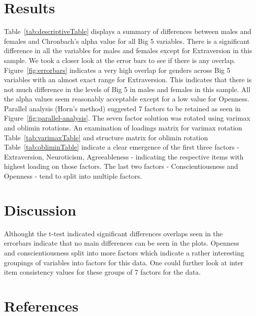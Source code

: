 \documentclass[
  english,
  man]{apa6}
\begin{document}
\hypertarget{results}{%
\section{Results}\label{results}}

Table~\ref{tab:descriptiveTable} displays a summary of differences between males and females and Chronbach's alpha value for all Big 5 variables. There is a significant difference in all the variables for males and females except for Extraversion in this sample. We took a closer look at the error bars to see if there is any overlap. Figure~\ref{fig:errorbars} indicates a very high overlap for genders across Big 5 variables with an almost exact range for Extraversion. This indicates that there is not much difference in the levels of Big 5 in males and females in this sample. All the alpha values seem reasonably acceptable except for a low value for Openness.
Parallel analysis (Horn's method) suggested 7 factors to be retained as seen in Figure~\ref{fig:parallel-analysis}. The seven factor solution was rotated using varimax and oblimin rotations. An examination of loadings matrix for varimax rotation Table~\ref{tab:varimaxTable} and structure matrix for oblimin rotation Table~\ref{tab:obliminTable} indicate a clear emergence of the first three factors -Extraversion, Neuroticism, Agreeableness - indicating the respective items with highest loading on those factors. The last two factors - Conscientiousness and Openness - tend to split into multiple factors.

\hypertarget{discussion}{%
\section{Discussion}\label{discussion}}

Althought the t-test indicated significant differences overlaps seen in the errorbars indicate that no main differences can be seen in the plots. Openness and conscientiousness split into more factors which indicate a rather interesting groupings of variables into factors for this data. One could further look at inter item consistency values for these groups of 7 factors for the data.

\newpage

\hypertarget{references}{%
\section{References}\label{references}}

\begingroup
\setlength{\parindent}{-0.5in}
\setlength{\leftskip}{0.5in}
\end{document}
